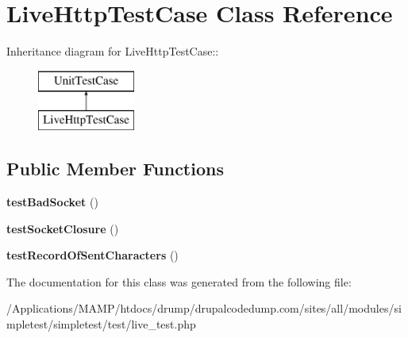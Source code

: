\hypertarget{class_live_http_test_case}{
\section{LiveHttpTestCase Class Reference}
\label{class_live_http_test_case}
}
Inheritance diagram for LiveHttpTestCase::\begin{figure}[H]
\begin{center}
\leavevmode
\includegraphics[height=2cm]{class_live_http_test_case}
\end{center}
\end{figure}
\subsection*{Public Member Functions}
\begin{DoxyCompactItemize}
\item 
\hypertarget{class_live_http_test_case_aa3d9eaab2aae44b77c454cc4fefd5d97}{
{\bfseries testBadSocket} ()}
\label{class_live_http_test_case_aa3d9eaab2aae44b77c454cc4fefd5d97}

\item 
\hypertarget{class_live_http_test_case_ada719009ca0041c76c1a568c40940ee5}{
{\bfseries testSocketClosure} ()}
\label{class_live_http_test_case_ada719009ca0041c76c1a568c40940ee5}

\item 
\hypertarget{class_live_http_test_case_a77ec024d0cc7522e9746e7d85f4a6259}{
{\bfseries testRecordOfSentCharacters} ()}
\label{class_live_http_test_case_a77ec024d0cc7522e9746e7d85f4a6259}

\end{DoxyCompactItemize}


The documentation for this class was generated from the following file:\begin{DoxyCompactItemize}
\item 
/Applications/MAMP/htdocs/drump/drupalcodedump.com/sites/all/modules/simpletest/simpletest/test/live\_\-test.php\end{DoxyCompactItemize}
